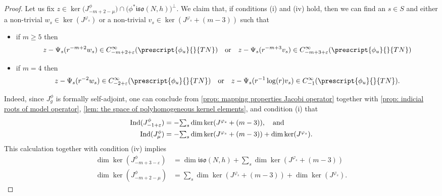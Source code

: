 \documentclass{article}
\numberwithin{equation}{section}        %
\theoremstyle{bfnote}
\theoremstyle{definition}
\theoremstyle{bfremark}
\begin{document}
\begin{proof}
    Let us fix $z \in \ker\big(J^{\phi}_{-m+2-\mu} \big) \cap \big(\phi^*\mathfrak{iso}(N,h)\big)^{\perp}$. We claim that, if conditions (i) and (iv) hold, then we can find an $s \in S$ and either a non-trivial $w_s \in \ker(J^{\varphi_s})$ or a non-trivial $v_s \in \ker(J^{\varphi_s}+(m-3))$ such that
    \begin{itemize}
        \item if $m \geq 5$ then
        \begin{equation*}
        z - \Psi_s(r^{-m+2} w_s) \in C^{\infty}_{-m+2+\varepsilon}(\prescript{\phi_u}{}{TN}) \quad \textup{or} \quad z - \Psi_s(r^{-m+3} v_s) \in C^{\infty}_{-m+3+\varepsilon}(\prescript{\phi_u}{}{TN})
        \end{equation*} 
    
        \item if $m = 4$ then 
        \begin{equation*}
        z - \Psi_s(r^{-2} w_s) \in C^{\infty}_{-2+\varepsilon}(\prescript{\phi_u}{}{TN}) \quad \textup{or} \quad z - \Psi_s(r^{-1} \log(r) v_s) \in C^{\infty}_{-1}(\prescript{\phi_u}{}{TN}) .
        \end{equation*}
    \end{itemize}
    
    Indeed, since $J^{\phi}_g$ is formally self-adjoint, one can conclude from \cref{prop: mapping properties Jacobi operator} together with \cref{prop: indicial roots of model operator}, \cref{lem: the space of polyhomogeneous kernel elements}, and condition (i) that 
    \begin{align*}
        \mathrm{Ind}(J^\phi_{-1+\varepsilon}) &= -\textstyle{\sum}_s \dim \ker(J^{\varphi_s}+(m-3)), \quad \textup{and} \\
    \mathrm{Ind}(J^{\phi}_\mu) &= -\textstyle{\sum}_s \dim \ker(J^{\varphi_s}+(m-3)) + \dim \ker(J^{\varphi_s}).
    \end{align*}
    This calculation together with condition (iv) implies
    \begin{align*}
        \dim \ker (J_{-m+3-\varepsilon}^{\phi}) &= \dim \mathfrak{iso}(N,h) + \textstyle{\sum}_s \dim \ker(J^{\varphi_s}+(m-3)) \\
        \dim \ker (J_{-m+2-\mu}^{\phi}) &= \textstyle{\sum}_s \dim \ker(J^{\varphi_s}+(m-3)) + \dim \ker(J^{\varphi_s}).
    \end{align*}
    

\end{proof}
\end{document}
